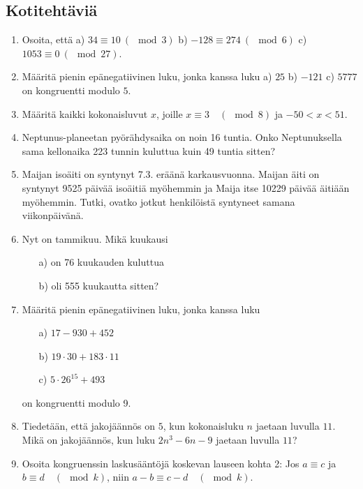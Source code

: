 \subsection*{Kotitehtäviä}

\begin{enumerate}

\item
Osoita, että a) $34 \equiv 10\ (\mod 3)$ b) $-128 \equiv 274\ (\mod 6)$ c) $1053 \equiv 0\ (\mod 27)$.

\item
Määritä pienin epänegatiivinen luku, jonka kanssa luku a) $25$ b) $-121$ c) $5777$ on kongruentti modulo $5$.

\item
Määritä kaikki kokonaisluvut $x$, joille $x \equiv 3\quad (\mod 8)$ ja $-50 < x < 51$.

\item Neptunus-planeetan pyörähdysaika on noin 16 tuntia. Onko Neptunuksella sama kellonaika 223 tunnin kuluttua kuin 49 tuntia sitten?

\item Maijan isoäiti on syntynyt 7.3. eräänä karkausvuonna. Maijan äiti on syntynyt 9525 päivää isoäitiä myöhemmin ja Maija itse 10229 päivää äitiään myöhemmin. Tutki, ovatko jotkut henkilöistä syntyneet samana viikonpäivänä.

\item Nyt on tammikuu. Mikä kuukausi
\begin{itemize}
\item[a)] on 76 kuukauden kuluttua
\item[b)] oli 555 kuukautta sitten?
\end{itemize}

\item Määritä pienin epänegatiivinen luku, jonka kanssa luku
\begin{itemize}
\item[a)] $17 - 930 + 452$
\item[b)] $19 \cdot 30 + 183 \cdot 11$
\item[c)] $5 \cdot 26^{15} + 493$
\end{itemize}
on kongruentti modulo 9.

\item
Tiedetään, että jakojäännös on $5$, kun kokonaisluku $n$ jaetaan luvulla $11$. Mikä on jakojäännös, kun luku $2n^3 - 6n - 9$ jaetaan luvulla $11$?

\item
Osoita kongruenssin laskusääntöjä koskevan lauseen kohta 2: Jos $a\equiv c$ ja $b\equiv d\quad (\mod k)$, niin $a-b\equiv c-d \quad(\mod k)$.


\end{enumerate}
